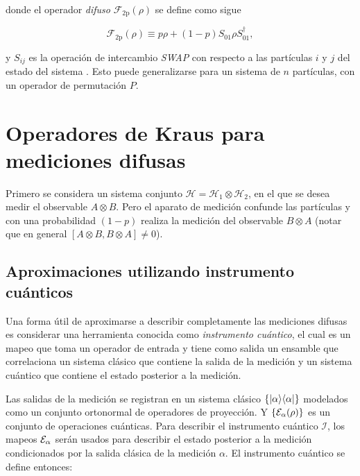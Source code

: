 donde el operador \textit{difuso } $\mathcal{F}_{\text{2p}}(\rho)$ se define como sigue 

\begin{equation}\label{operador_difuso}
    \mathcal{F}_{\text{2p}}(\rho)\equiv p\rho+(1-p)S_{01}\rho S_{01}^\dagger,
\end{equation}

 y  $S_{ij}$ es la operación de intercambio \textit{SWAP} con respecto a las partículas $i$ y $j$ del estado del sistema {\cite{Pineda_2021}}. Esto puede generalizarse para un sistema de $n$ partículas, con un operador de permutación $P$.%

 \section{Operadores de Kraus para mediciones difusas}

 Primero se considera un sistema conjunto $\mathcal{H}=\mathcal{H}_1\otimes \mathcal{H}_2$, en el que se desea medir el observable $A\otimes B$. Pero el aparato de medición confunde las partículas y con una probabilidad $(1-p) $ realiza la medición del observable $B\otimes A$ (notar que en general $[A\otimes B,B\otimes A]\ne 0$). 

   
\subsection{Aproximaciones utilizando instrumento cuánticos}

Una forma útil de aproximarse a describir completamente las mediciones difusas es considerar una herramienta conocida como \textit{instrumento cuántico}, el cual es un mapeo que toma un operador de entrada y tiene como salida un ensamble que correlaciona un sistema clásico que contiene la salida de la medición y un sistema cuántico que contiene el estado posterior a la medición. 


Las salidas de la medición se registran en un sistema clásico $\{|\alpha\rangle \langle \alpha |\}$ modelados como un conjunto ortonormal de operadores de proyección. Y $\{\mathcal{E}_\alpha(\rho)\}$ es un conjunto de operaciones cuánticas. Para describir el instrumento cuántico $\mathcal{I}$, los mapeos $\mathcal{E}_\alpha$ serán usados para describir  el estado posterior a la medición condicionados por la salida clásica de la medición $\alpha$. El instrumento cuántico se define entonces:


